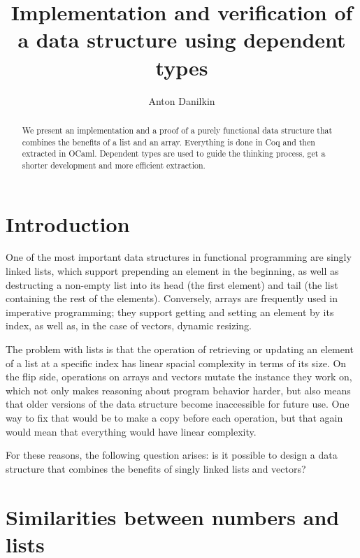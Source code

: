 \documentclass{article}
\title{Implementation and verification of\protect\\a data structure using dependent types}
\author{Anton Danilkin}
\newenvironment{no_space_center}
    {\parskip=0pt\par\nopagebreak\centering}
    {\par\noindent\ignorespacesafterend}
\begin{document}
\begin{no_space_center}
    \begin{minipage}{10cm}
        \maketitle

        \begin{abstract}
            We present an implementation and a proof of a purely functional data structure that combines the benefits of a list and an array. Everything is done in Coq and then extracted in OCaml. Dependent types are used to guide the thinking process, get a shorter development and more efficient extraction.
        \end{abstract}
    \end{minipage}
\end{no_space_center}

\vspace{2cm}%

\section{Introduction}

One of the most important data structures in functional programming are singly linked lists, which support prepending an element in the beginning, as well as destructing a non-empty list into its head (the first element) and tail (the list containing the rest of the elements). Conversely, arrays are frequently used in imperative programming; they support getting and setting an element by its index, as well as, in the case of vectors, dynamic resizing.

The problem with lists is that the operation of retrieving or updating an element of a list at a specific index has linear spacial complexity in terms of its size. On the flip side, operations on arrays and vectors mutate the instance they work on, which not only makes reasoning about program behavior harder, but also means that older versions of the data structure become inaccessible for future use. One way to fix that would be to make a copy before each operation, but that again would mean that everything would have linear complexity.

For these reasons, the following question arises: is it possible to design a data structure that combines the benefits of singly linked lists and vectors?

\section{Similarities between numbers and lists}
\end{document}
